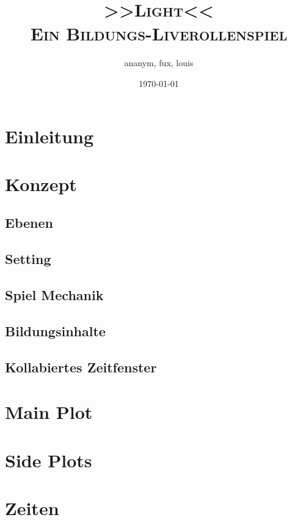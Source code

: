 \documentclass[12pt, a4paper, openany]{book}
\title{
  { \Large 
    \textbf{\textsc{>>Light<<}}\\
  }
  \vspace{0.4cm}
  { \large \color{gray}
    \textsc{Ein Bildungs-Liverollenspiel}
  }
}
\author{ananym, fux, louis}
\date{{\small \today}}
\begin{document}
\frontmatter
\maketitle

\chapter*{Einleitung}


\tableofcontents

\mainmatter
\chapter{Konzept}

\section{Ebenen}

\section{Setting}\label{sec:setting}

\section{Spiel Mechanik}

\section{Bildungsinhalte}

\section{Kollabiertes Zeitfenster}\label{sec:zeitfenster}


\chapter{Main Plot}


\chapter{Side Plots}


\chapter{Zeiten}

\end{document}
